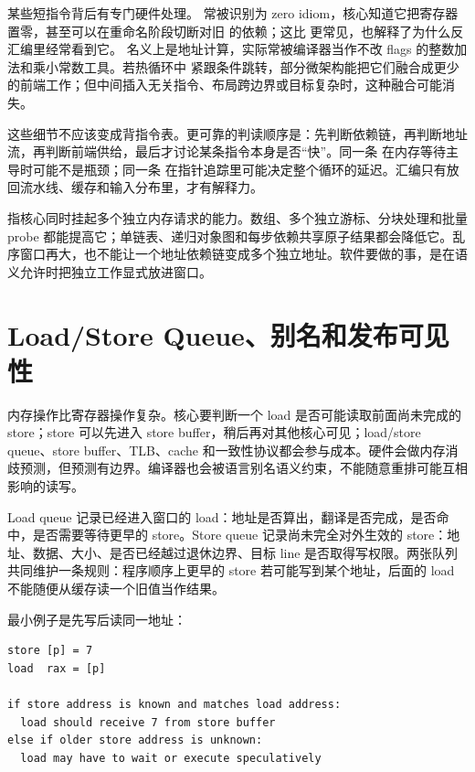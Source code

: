某些短指令背后有专门硬件处理。 常被识别为 zero idiom，核心知道它把寄存器置零，甚至可以在重命名阶段切断对旧  的依赖；这比  更常见，也解释了为什么反汇编里经常看到它。 名义上是地址计算，实际常被编译器当作不改 flags 的整数加法和乘小常数工具。若热循环中  紧跟条件跳转，部分微架构能把它们融合成更少的前端工作；但中间插入无关指令、布局跨边界或目标复杂时，这种融合可能消失。

这些细节不应该变成背指令表。更可靠的判读顺序是：先判断依赖链，再判断地址流，再判断前端供给，最后才讨论某条指令本身是否“快”。同一条  在内存等待主导时可能不是瓶颈；同一条  在指针追踪里可能决定整个循环的延迟。汇编只有放回流水线、缓存和输入分布里，才有解释力。

 指核心同时挂起多个独立内存请求的能力。数组、多个独立游标、分块处理和批量 probe 都能提高它；单链表、递归对象图和每步依赖共享原子结果都会降低它。乱序窗口再大，也不能让一个地址依赖链变成多个独立地址。软件要做的事，是在语义允许时把独立工作显式放进窗口。

\section{Load/Store Queue、别名和发布可见性}

内存操作比寄存器操作复杂。核心要判断一个 load 是否可能读取前面尚未完成的 store；store 可以先进入 store buffer，稍后再对其他核心可见；load/store queue、store buffer、TLB、cache 和一致性协议都会参与成本。硬件会做内存消歧预测，但预测有边界。编译器也会被语言别名语义约束，不能随意重排可能互相影响的读写。

Load queue 记录已经进入窗口的 load：地址是否算出，翻译是否完成，是否命中，是否需要等待更早的 store。Store queue 记录尚未完全对外生效的 store：地址、数据、大小、是否已经越过退休边界、目标 line 是否取得写权限。两张队列共同维护一条规则：程序顺序上更早的 store 若可能写到某个地址，后面的 load 不能随便从缓存读一个旧值当作结果。

最小例子是先写后读同一地址：

\begin{lstlisting}[numbers=none,caption={同线程内 store 后 load 的地址账本}]
store [p] = 7
load  rax = [p]

if store address is known and matches load address:
  load should receive 7 from store buffer
else if older store address is unknown:
  load may have to wait or execute speculatively
\end{lstlisting}

